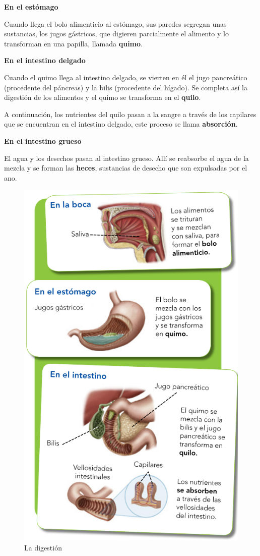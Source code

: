 \vspace{3mm}
\textbf{En el estómago}

\vspace{3mm}
Cuando llega el bolo alimenticio al estómago, sus paredes segregan unas sustancias, los jugos gástricos, que digieren parcialmente el alimento y lo transforman en una papilla, llamada \textbf{quimo}.

\vspace{3mm}
\textbf{En el intestino delgado}

\vspace{3mm}
Cuando el quimo llega al intestino delgado, se vierten en él el jugo pancreático (procedente del páncreas) y la bilis (procedente del hígado). Se completa así la digestión de los alimentos y el quimo se transforma en el \textbf{quilo}.

\vspace{3mm}
A continuación, los nutrientes del quilo pasan a la sangre a través de los capilares que se encuentran en el intestino delgado, este proceso se llama \textbf{absorción}.

\vspace{3mm}
\textbf{En el intestino grueso}

\vspace{3mm}
El agua y los desechos pasan al intestino grueso. Allí se reabsorbe el agua de la mezcla y se forman las \textbf{heces}, sustancias de desecho que son expulsadas por el ano.

\begin{figure}[!ht]
    \centering
    \includegraphics[width=0.7\linewidth]{Tema3/03_Digestion.png}
    \caption{La digestión}
    \label{fig:digestion}
\end{figure}

